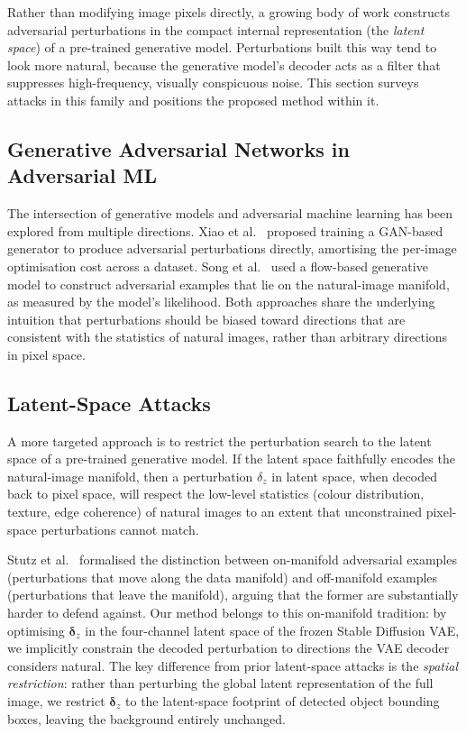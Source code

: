 \documentclass[12pt,a4paper]{report}
\begin{document}
Rather than modifying image pixels directly, a growing body of work
constructs adversarial perturbations in the compact internal
representation (the \emph{latent space}) of a pre-trained
generative model. Perturbations built this way tend to look more natural,
because the generative model's decoder acts as a filter that suppresses
high-frequency, visually conspicuous noise. This section surveys attacks
in this family and positions the proposed method within it.

\subsection{Generative Adversarial Networks in Adversarial ML}

The intersection of generative models and adversarial machine learning has
been explored from multiple directions. Xiao et al.\ \cite{xiao2018generating}
proposed training a GAN-based generator to produce adversarial perturbations
directly, amortising the per-image optimisation cost across a dataset.
Song et al.\ \cite{song2018unrestricted} used a flow-based generative model to
construct adversarial examples that lie on the natural-image manifold, as
measured by the model's likelihood. Both approaches share the underlying
intuition that perturbations should be biased toward directions that are
consistent with the statistics of natural images, rather than arbitrary
directions in pixel space.

\subsection{Latent-Space Attacks}

A more targeted approach is to restrict the perturbation search to the latent
space of a pre-trained generative model. If the latent space faithfully
encodes the natural-image manifold, then a perturbation $\delta_z$ in latent
space, when decoded back to pixel space, will respect the low-level statistics
(colour distribution, texture, edge coherence) of natural images to an extent
that unconstrained pixel-space perturbations cannot match.

Stutz et al.\ \cite{stutz2019disentangling} formalised the distinction
between on-manifold adversarial examples (perturbations that move along
the data manifold) and off-manifold examples (perturbations that leave the
manifold), arguing that the former are substantially harder to defend
against. Our method belongs to this on-manifold tradition: by optimising
$\bm{\delta}_z$ in the four-channel latent space of the frozen Stable
Diffusion VAE, we implicitly constrain the decoded perturbation to directions
the VAE decoder considers natural. The key difference from prior latent-space
attacks is the \emph{spatial restriction}: rather than perturbing the global
latent representation of the full image, we restrict $\bm{\delta}_z$ to the
latent-space footprint of detected object bounding boxes, leaving the
background entirely unchanged.
\end{document}
